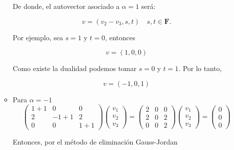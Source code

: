 \begin{enumerate}
\begin{itemize}
	    De donde, el autovector asociado a $\alpha=1$ será:\\
	    \begin{tcolorbox}
	    $$v=(v_2-v_3,s,t) \quad s,t\in \textbf{F}.$$
	    \end{tcolorbox}

	    Por ejemplo, sea $s=1$ y $t=0$, entonces
	    \begin{tcolorbox}
		\begin{equation}
		    v=(1,0,0)
		\end{equation}
	    \end{tcolorbox}

	    Como existe la dualidad podemos tomar $s=0$ y $t=1$. Por lo tanto,
	    \begin{tcolorbox}
		\begin{equation}
		    v=(-1,0,1)
		\end{equation}
	    \end{tcolorbox}
	    \vspace{.6cm}

	\item Para $\alpha=-1$
	    $$
	    \left(\begin{array}{*{3}{c}}
		1+1 & 0 & 0\\
		2 & -1+1 & 2 \\
		0 & 0 & 1+1
	    \end{array}\right)  
	    \left(\begin{array}{c}
		v_1 \\
		v_2 \\
		v_3
	    \end{array}\right) = 
	    \left(\begin{array}{*{3}{c}}
		2 & 0 & 0 \\
		2 & 0 & 2 \\
		0 & 0 & 2
	    \end{array}\right)
	    \left(\begin{array}{c}
		v_1 \\
		v_2 \\
		v_3
	    \end{array}\right) = 
	    \left(\begin{array}{c}
		0 \\
		0 \\
		0	
	    \end{array}\right)
	    $$

	    Entonces, por el método de eliminación Gauss-Jordan


\end{itemize}
\end{enumerate}
